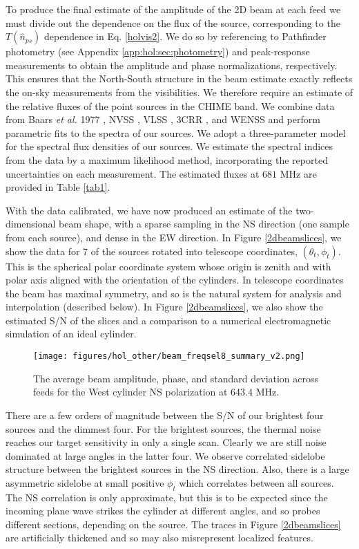 To produce the final estimate of the amplitude of the 2D beam at each feed we must divide out the dependence on the flux of the source, corresponding to the $T(\hat{n}_{ps})$ dependence in Eq. \ref{holvis2}. We do so by referencing to Pathfinder photometry (see Appendix \ref{app:hol:sec:photometry}) and peak-response measurements to obtain the amplitude and phase normalizations, respectively. This ensures that the North-South structure in the beam estimate exactly reflects the on-sky measurements from the visibilities. We therefore require an estimate of the relative fluxes of the point sources in the CHIME band. We combine data from Baars {\it et al.} 1977 \citep{baars}, NVSS \citep{NVSS}, VLSS \citep{VLSS}, 3CRR \citep{3CRR}, and WENSS \citep{WENSS} and perform parametric fits to the spectra of our sources. We adopt a three-parameter model for the spectral flux densities of our sources. We estimate the spectral indices from the data by a maximum likelihood method, incorporating the reported uncertainties on each measurement. The estimated fluxes at $681$ MHz are provided in Table \ref{tab1}.

With the data calibrated, we have now produced an estimate of the two-dimensional beam shape, with a sparse sampling in the NS direction (one sample from each source), and dense in the EW direction. In Figure \ref{2dbeamslices}, we show the data for 7 of the sources rotated into telescope coordinates, $(\theta_t, \phi_t)$. This is the spherical polar coordinate system whose origin is zenith and with polar axis aligned with the orientation of the cylinders. In telescope coordinates the beam has maximal symmetry, and so is the natural system for analysis and interpolation (described below). In Figure \ref{2dbeamslices}, we also show the estimated S/N of the slices and a comparison to a numerical electromagnetic simulation of an ideal cylinder.

\begin{figure}[h!]
\begin{center}
\texttt{[image: figures/hol\_other/beam\_freqsel8\_summary\_v2.png]}
\caption{The average beam amplitude, phase, and standard deviation across feeds for the West cylinder NS polarization at 643.4 MHz.\label{example}}
\end{center}
\end{figure}

There are a few orders of magnitude between the S/N of our brightest four sources and the dimmest four. For the brightest sources, the thermal noise reaches our target sensitivity \citep{mmodes2} in only a single scan. Clearly we are still noise dominated at large angles in the latter four. We observe correlated sidelobe structure between the brightest sources in the NS direction. Also, there is a large asymmetric sidelobe at small positive $\phi_t$ which correlates between all sources. The NS correlation is only approximate, but this is to be expected since the incoming plane wave strikes the cylinder at different angles, and so probes different sections, depending on the source. The traces in Figure \ref{2dbeamslices} are artificially thickened and so may also misrepresent localized features.


